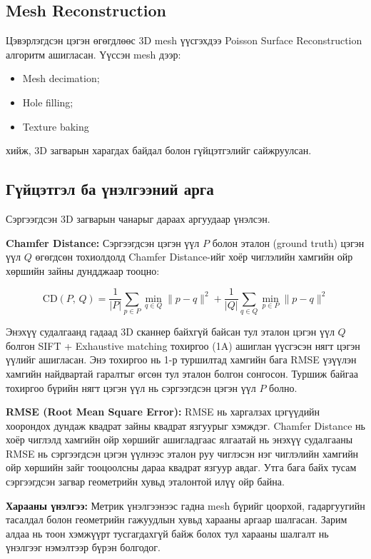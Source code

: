 \subsection{Mesh Reconstruction}
Цэвэрлэгдсэн цэгэн өгөгдлөөс 3D mesh үүсгэхдээ Poisson Surface Reconstruction алгоритм ашигласан. Үүссэн mesh дээр:
\begin{itemize}
    \item Mesh decimation;
    \item Hole filling;
    \item Texture baking
\end{itemize}
хийж, 3D загварын харагдах байдал болон гүйцэтгэлийг сайжруулсан.

\subsection{Гүйцэтгэл ба үнэлгээний арга}

Сэргээгдсэн 3D загварын чанарыг дараах аргуудаар үнэлсэн.

\textbf{Chamfer Distance:} Сэргээгдсэн цэгэн үүл $P$ болон эталон (ground truth) цэгэн үүл $Q$ өгөгдсөн тохиолдолд Chamfer Distance-ийг хоёр чиглэлийн хамгийн ойр хөршийн зайны дундджаар тооцно:

\begin{equation}
\mathrm{CD}(P,\,Q) = \frac{1}{|P|}\sum_{p \in P}\min_{q \in Q}\|p - q\|^2 + \frac{1}{|Q|}\sum_{q \in Q}\min_{p \in P}\|p - q\|^2
\label{eq:chamfer}
\end{equation}

Энэхүү судалгаанд гадаад 3D сканнер байхгүй байсан тул эталон цэгэн үүл $Q$ болгон SIFT + Exhaustive matching тохиргоо (1A) ашиглан үүсгэсэн нягт цэгэн үүлийг ашигласан. Энэ тохиргоо нь 1-р туршилтад хамгийн бага RMSE үзүүлэн хамгийн найдвартай гаралтыг өгсөн тул эталон болгон сонгосон. Туршиж байгаа тохиргоо бүрийн нягт цэгэн үүл нь сэргээгдсэн цэгэн үүл $P$ болно.

\textbf{RMSE (Root Mean Square Error):} RMSE нь харгалзах цэгүүдийн хоорондох дундаж квадрат зайны квадрат язгуурыг хэмждэг. Chamfer Distance нь хоёр чиглэлд хамгийн ойр хөршийг ашигладгаас ялгаатай нь энэхүү судалгааны RMSE нь сэргээгдсэн цэгэн үүлнээс эталон руу чиглэсэн нэг чиглэлийн хамгийн ойр хөршийн зайг тооцоолсны дараа квадрат язгуур авдаг. Утга бага байх тусам сэргээгдсэн загвар геометрийн хувьд эталонтой илүү ойр байна.

\textbf{Харааны үнэлгээ:} Метрик үнэлгээнээс гадна mesh бүрийг цоорхой, гадаргуугийн тасалдал болон геометрийн гажуудлын хувьд харааны аргаар шалгасан. Зарим алдаа нь тоон хэмжүүрт тусгагдахгүй байж болох тул харааны шалгалт нь үнэлгээг нэмэлтээр бүрэн болгодог.

